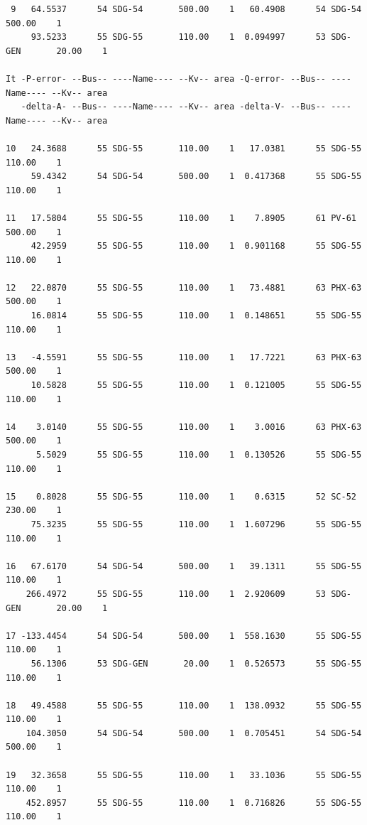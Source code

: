 \documentclass[12pt]{article}
\begin{document}
\begin{Verbatim}
 9   64.5537      54 SDG-54       500.00    1   60.4908      54 SDG-54       500.00    1
     93.5233      55 SDG-55       110.00    1  0.094997      53 SDG-GEN       20.00    1

It -P-error- --Bus-- ----Name---- --Kv-- area -Q-error- --Bus-- ----Name---- --Kv-- area
   -delta-A- --Bus-- ----Name---- --Kv-- area -delta-V- --Bus-- ----Name---- --Kv-- area

10   24.3688      55 SDG-55       110.00    1   17.0381      55 SDG-55       110.00    1
     59.4342      54 SDG-54       500.00    1  0.417368      55 SDG-55       110.00    1

11   17.5804      55 SDG-55       110.00    1    7.8905      61 PV-61        500.00    1
     42.2959      55 SDG-55       110.00    1  0.901168      55 SDG-55       110.00    1

12   22.0870      55 SDG-55       110.00    1   73.4881      63 PHX-63       500.00    1
     16.0814      55 SDG-55       110.00    1  0.148651      55 SDG-55       110.00    1

13   -4.5591      55 SDG-55       110.00    1   17.7221      63 PHX-63       500.00    1
     10.5828      55 SDG-55       110.00    1  0.121005      55 SDG-55       110.00    1

14    3.0140      55 SDG-55       110.00    1    3.0016      63 PHX-63       500.00    1
      5.5029      55 SDG-55       110.00    1  0.130526      55 SDG-55       110.00    1

15    0.8028      55 SDG-55       110.00    1    0.6315      52 SC-52        230.00    1
     75.3235      55 SDG-55       110.00    1  1.607296      55 SDG-55       110.00    1

16   67.6170      54 SDG-54       500.00    1   39.1311      55 SDG-55       110.00    1
    266.4972      55 SDG-55       110.00    1  2.920609      53 SDG-GEN       20.00    1

17 -133.4454      54 SDG-54       500.00    1  558.1630      55 SDG-55       110.00    1
     56.1306      53 SDG-GEN       20.00    1  0.526573      55 SDG-55       110.00    1

18   49.4588      55 SDG-55       110.00    1  138.0932      55 SDG-55       110.00    1
    104.3050      54 SDG-54       500.00    1  0.705451      54 SDG-54       500.00    1

19   32.3658      55 SDG-55       110.00    1   33.1036      55 SDG-55       110.00    1
    452.8957      55 SDG-55       110.00    1  0.716826      55 SDG-55       110.00    1


\end{Verbatim}
\end{document}
